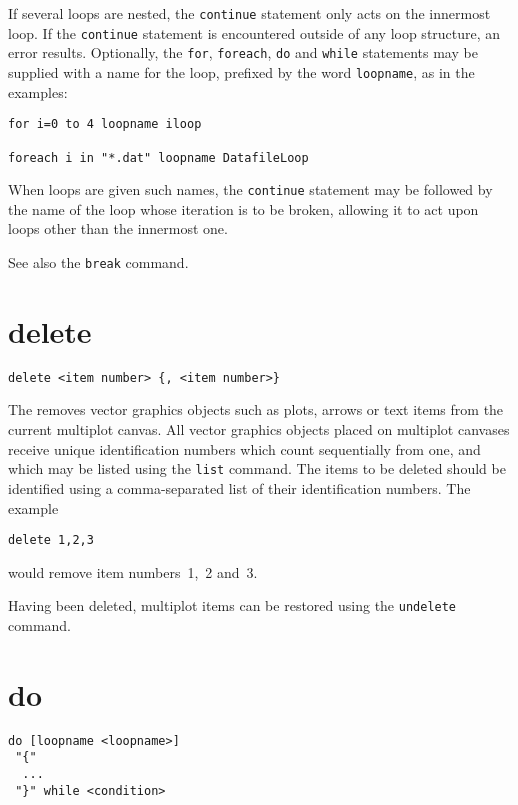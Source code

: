 If several loops are nested, the {\tt continue} statement only
acts on the innermost loop. If the {\tt continue} statement is encountered outside of any
loop structure, an error results. Optionally, the {\tt for}, {\tt foreach},
{\tt do} and {\tt while} statements may be supplied with a name for the loop, prefixed by
the word {\tt loopname}, as in the examples:

\begin{verbatim}
for i=0 to 4 loopname iloop

foreach i in "*.dat" loopname DatafileLoop
\end{verbatim}

\noindent When loops are given such names, the {\tt continue} statement may be
followed by the name of the loop whose iteration is to be broken, allowing it
to act upon loops other than the innermost one.

See also the {\tt break} command.


\section{delete}

\begin{verbatim}
delete <item number> {, <item number>}
\end{verbatim}

The  removes vector graphics objects such as plots, arrows or
text items from the current multiplot canvas. All vector graphics objects
placed on multiplot canvases receive unique identification numbers which count
sequentially from one, and which may be listed using the {\tt list} command.
The items to be deleted should be identified using a comma-separated list of
their identification numbers. The example

\begin{verbatim}
delete 1,2,3
\end{verbatim}

\noindent would remove item numbers~1,~2 and~3.

Having been deleted, multiplot items can be restored using the {\tt undelete}
command.


\section{do}

\begin{verbatim}
do [loopname <loopname>]
 "{"
  ...
 "}" while <condition>
\end{verbatim}

